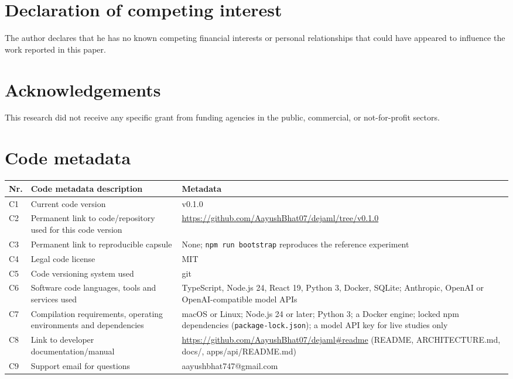\documentclass[preprint,12pt]{elsarticle}
\newcommand{\code}[1]{\texttt{#1}}
\begin{document}
\section*{Declaration of competing interest}

The author declares that he has no known competing financial interests or
personal relationships that could have appeared to influence the work reported
in this paper.

\section*{Acknowledgements}

This research did not receive any specific grant from funding agencies in the
public, commercial, or not-for-profit sectors.




\section*{Code metadata}

\begin{table}[h]
\centering
\small
\begin{tabularx}{\linewidth}{@{}lXX@{}}
\toprule
Nr. & Code metadata description & Metadata \\
\midrule
C1 & Current code version & v0.1.0 \\
C2 & Permanent link to code/repository used for this code version & \url{https://github.com/AayushBhat07/dejaml/tree/v0.1.0} \\
C3 & Permanent link to reproducible capsule & None; \code{npm run bootstrap} reproduces the reference experiment \\
C4 & Legal code license & MIT \\
C5 & Code versioning system used & git \\
C6 & Software code languages, tools and services used & TypeScript, Node.js 24, React 19, Python 3, Docker, SQLite; Anthropic, OpenAI or OpenAI-compatible model APIs \\
C7 & Compilation requirements, operating environments and dependencies & macOS or Linux; Node.js 24 or later; Python 3; a Docker engine; locked npm dependencies (\code{package-lock.json}); a model API key for live studies only \\
C8 & Link to developer documentation/manual & \url{https://github.com/AayushBhat07/dejaml\#readme} (README, ARCHITECTURE.md, docs/, apps/api/README.md) \\
C9 & Support email for questions & aayushbhat747@gmail.com \\
\bottomrule
\end{tabularx}
\end{table}
\end{document}
